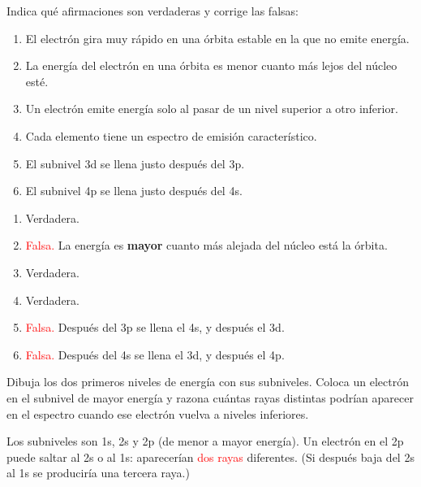 \begin{exercise}
    Indica qué afirmaciones son verdaderas y corrige las falsas:
    \begin{enumerate}[label=\alph*)]
        \item El electrón gira muy rápido en una órbita estable en la que no emite energía.
        \item La energía del electrón en una órbita es menor cuanto más lejos del núcleo esté.
        \item Un electrón emite energía solo al pasar de un nivel superior a otro inferior.
        \item Cada elemento tiene un espectro de emisión característico.
        \item El subnivel 3d se llena justo después del 3p.
        \item El subnivel 4p se llena justo después del 4s.
    \end{enumerate}
    \begin{solu}
        \begin{enumerate}[label=\alph*)]
            \item Verdadera.
            \item \textcolor{red}{Falsa.} La energía es \textbf{mayor} cuanto más alejada del núcleo está la órbita.
            \item Verdadera.
            \item Verdadera.
            \item \textcolor{red}{Falsa.} Después del 3p se llena el 4s, y después el 3d.
            \item \textcolor{red}{Falsa.} Después del 4s se llena el 3d, y después el 4p.
        \end{enumerate}
    \end{solu}
\end{exercise}

\begin{exercise}
    Dibuja los dos primeros niveles de energía con sus subniveles. Coloca un electrón en el subnivel de mayor energía y razona cuántas rayas distintas podrían aparecer en el espectro cuando ese electrón vuelva a niveles inferiores.
    \begin{solu}
        Los subniveles son 1s, 2s y 2p (de menor a mayor energía). Un electrón en el 2p puede saltar al 2s o al 1s: aparecerían \textcolor{red}{dos rayas} diferentes. (Si después baja del 2s al 1s se produciría una tercera raya.)
    \end{solu}
\end{exercise}

